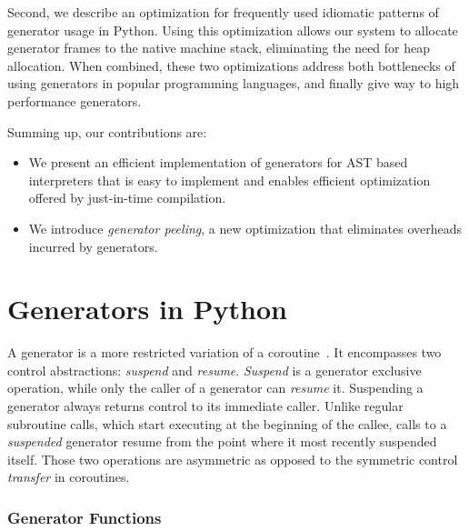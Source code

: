 Second, we describe an optimization for frequently used idiomatic patterns of generator usage in Python.
Using this optimization allows our system to allocate generator frames to the native machine stack, eliminating the need for heap allocation.
When combined, these two optimizations address both bottlenecks of using generators in popular programming languages, and finally give way to high performance generators.

\noindent{}Summing up, our contributions are:

\begin{itemize}
\item We present an efficient implementation of generators for AST based interpreters that is easy to implement and enables efficient optimization offered by just-in-time compilation.
\item We introduce \emph{generator peeling}, a new optimization that eliminates overheads incurred by generators.
\end{itemize}

\section{Generators in Python}

A generator is a more restricted variation of a coroutine~\cite{grune1977view,Moura2009}.
It encompasses two control abstractions: \emph{suspend} and \emph{resume}.
\emph{Suspend} is a generator exclusive operation, while only the caller of a generator can \emph{resume} it.
Suspending a generator always returns control to its immediate caller.
Unlike regular subroutine calls, which start executing at the beginning of the callee, calls to a \emph{suspended} generator resume
from the point where it most recently suspended itself.
Those two operations are asymmetric as opposed to the symmetric control \emph{transfer} in coroutines.

\subsubsection*{Generator Functions}

